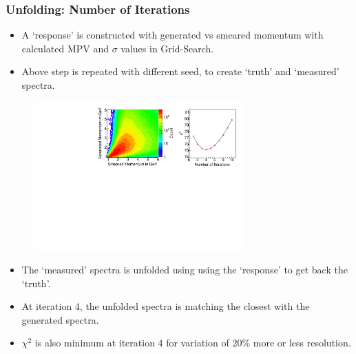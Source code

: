 \documentclass{beamer}
\begin{document}
\begin{frame}[shrink]
  \frametitle{Unfolding: Number of Iterations}
  \vspace*{-9pt}
  \begin{itemize} \itemsep -1pt
  \item A `response' is constructed with generated vs smeared
    momentum with calculated MPV and $\sigma$ values in Grid-Search.
  \item Above step is repeated with different seed, to create `truth'
    and `measured' spectra.
  \end{itemize}
  \vspace*{-9pt}
  \begin{figure}[h!]
    \includegraphics[width=0.72\textwidth]{ResoResponse_Grid.pdf}
  \end{figure}
  \vspace*{-9pt}
  \begin{itemize} %
  \item The `measured' spectra is unfolded using using the `response'
    to get back the `truth'.
  \item At iteration 4, the unfolded spectra is matching the
    closest with the generated spectra.
  \item $\chi^2$ is also minimum at iteration 4 for variation of
    20\% more or less resolution.
  \end{itemize}
\end{frame}
\end{document}

